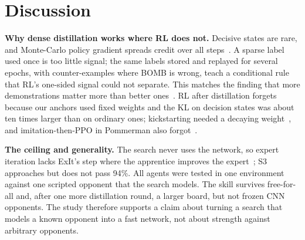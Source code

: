 \documentclass[conference]{IEEEtran}
\begin{document}
\section{Discussion}

\textbf{Why dense distillation works where RL does not.} Decisive states are rare, and Monte-Carlo policy gradient spreads credit over all steps~\cite{williams1992reinforce}. A sparse label used once is too little signal; the same labels stored and replayed for several epochs, with counter-examples where BOMB is wrong, teach a conditional rule that RL's one-sided signal could not separate. This matches the finding that more demonstrations matter more than better ones~\cite{kartal2019safer}. RL after distillation forgets because our anchors used fixed weights and the KL on decision states was about ten times larger than on ordinary ones; kickstarting needed a decaying weight~\cite{schmitt2018kickstart}, and imitation-then-PPO in Pommerman also forgot~\cite{meisheri2019}.

\textbf{The ceiling and generality.} The search never uses the network, so expert iteration lacks ExIt's step where the apprentice improves the expert~\cite{anthony2017exit}; S3 approaches but does not pass 94\%. All agents were tested in one environment against one scripted opponent that the search models. The skill survives free-for-all and, after one more distillation round, a larger board, but not frozen CNN opponents. The study therefore supports a claim about turning a search that models a known opponent into a fast network, not about strength against arbitrary opponents.
\end{document}
